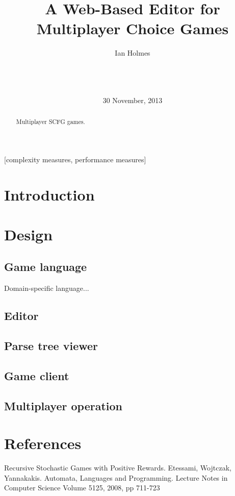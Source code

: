 \documentclass{acm_proc_article-sp}
\begin{document}
\title{A Web-Based Editor for Multiplayer Choice Games}
\author{
\alignauthor
Ian Holmes\\
       \\
       \\
       \\
}
\date{30 November, 2013}

\maketitle
\begin{abstract}
Multiplayer SCFG games.
\end{abstract}

[complexity measures, performance measures]



\section{Introduction}

\section{Design}


\subsection{Game language}

Domain-specific language...


\subsection{Editor}


\subsection{Parse tree viewer}


\subsection{Game client}


\subsection{Multiplayer operation}







\section{References}

Recursive Stochastic Games with Positive Rewards. Etessami, Wojtczak, Yannakakis. Automata, Languages and Programming. Lecture Notes in Computer Science Volume 5125, 2008, pp 711-723
\balancecolumns
\end{document}
